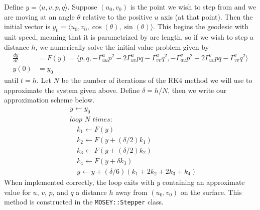 \documentclass[12pt]{article}
\begin{document}
		Define $y = \langle u , v , p , q \rangle$.
		Suppose $(u_0,v_0)$ is the point we wish to step from and we are moving at an angle $\theta$ relative to the positive $u$ axis (at that point).
		Then the initial vector is $y_0 = \langle u_0 , v_0 , \cos(\theta) , \sin(\theta) \rangle$.
		This begins the geodesic with unit speed, meaning that it is parametrized by arc length, so if we wish to step a distance $h$, we numerically solve the initial value problem given by %
		\begin{align*}
			\frac{dy}{dt} & = F(y) = \langle p , q , -\Gamma^u_{uu}p^2-2\Gamma^u_{uv}pq-\Gamma^u_{vv}q^2 , -\Gamma^v_{uu}p^2-2\Gamma^v_{uv}pq-\Gamma^v_{vv}q^2 \rangle \\
			y(0) & = y_0
		\end{align*}
		until $t = h$.
		Let $N$ be the number of iterations of the RK4 method we will use to approximate the system given above.
		Define $\delta = h/N$, then we write our approximation scheme below.
		\begin{align*}
			& y \gets y_0 \\
			& \textit{loop } N \textit{ times:} \\
			& \quad k_1 \gets F(y) \\
			& \quad k_2 \gets F\left(y+(\delta/2)k_1\right) \\
			& \quad k_3 \gets F\left(y+(\delta/2)k_2\right) \\
			& \quad k_4 \gets F\left(y + \delta k_3\right) \\
			& \quad y \gets y+(\delta/6)(k_1+2k_2+2k_3+k_4)
		\end{align*}
		When implemented correctly, the loop exits with $y$ containing an approximate value for $u$, $v$, $p$, and $q$ a distance $h$ away from $(u_0, v_0)$ on the surface.
		This method is constructed in the \texttt{MOSEY::Stepper} class.
	
\end{document}
